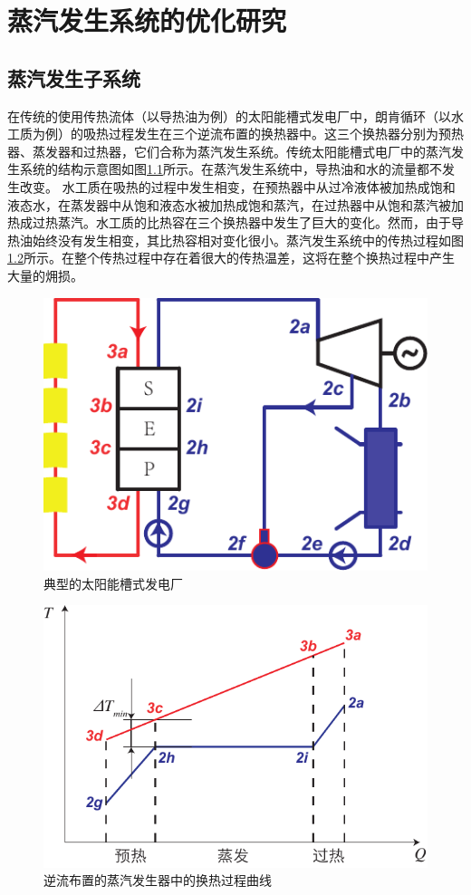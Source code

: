 \chapter{蒸汽发生系统的优化研究}
\label{cha:osgs}
\section{蒸汽发生子系统}

在传统的使用传热流体（以导热油为例）的太阳能槽式发电厂中，朗肯循环（以水工质为例）的吸热过程发生在三个逆流布置的换热器中。这三个换热器分别为预热器、蒸发器和过热器，它们合称为蒸汽发生系统。传统太阳能槽式电厂中的蒸汽发生系统的结构示意图如图\ref{fig:PTC}所示。在蒸汽发生系统中，导热油和水的流量都不发生改变。
水工质在吸热的过程中发生相变，在预热器中从过冷液体被加热成饱和液态水，在蒸发器中从饱和液态水被加热成饱和蒸汽，在过热器中从饱和蒸汽被加热成过热蒸汽。水工质的比热容在三个换热器中发生了巨大的变化。然而，由于导热油始终没有发生相变，其比热容相对变化很小。蒸汽发生系统中的传热过程如图\ref{fig:DeltaTmin}所示。在整个传热过程中存在着很大的传热温差，这将在整个换热过程中产生大量的㶲损。

\noindent \begin{figure}[htbp]
\begin{center}
	\includegraphics[width = 0.4\columnwidth]{fig/PTC}
	\caption{典型的太阳能槽式发电厂}
	\label{fig:PTC}
\end{center}
\end{figure}

\noindent \begin{figure}[htbp]
\begin{center}
	\includegraphics[width = 0.5\columnwidth]{fig/DeltaTmin}
	\caption{逆流布置的蒸汽发生器中的换热过程曲线}
	\label{fig:DeltaTmin}
\end{center}
\end{figure}


